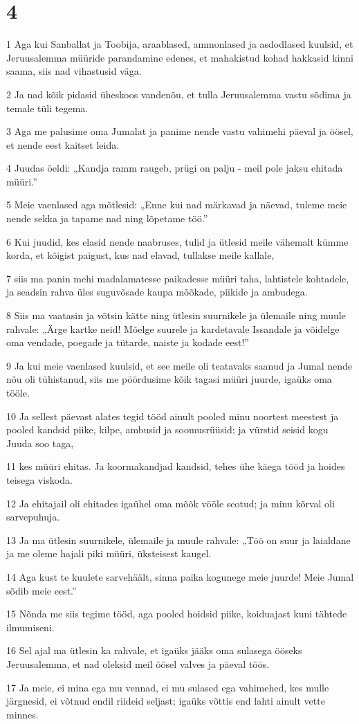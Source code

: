 \chapter{4}

\par 1 Aga kui Sanballat ja Toobija, araablased, ammonlased ja asdodlased kuulsid, et Jeruusalemma müüride parandamine edenes, et mahakistud kohad hakkasid kinni saama, siis nad vihastusid väga.
\par 2 Ja nad kõik pidasid üheskoos vandenõu, et tulla Jeruusalemma vastu sõdima ja temale tüli tegema.
\par 3 Aga me palusime oma Jumalat ja panime nende vastu vahimehi päeval ja öösel, et nende eest kaitset leida.
\par 4 Juudas öeldi: „Kandja ramm raugeb, prügi on palju - meil pole jaksu ehitada müüri.”
\par 5 Meie vaenlased aga mõtlesid: „Enne kui nad märkavad ja näevad, tuleme meie nende sekka ja tapame nad ning lõpetame töö.”
\par 6 Kui juudid, kes elasid nende naabruses, tulid ja ütlesid meile vähemalt kümme korda, et kõigist paigust, kus nad elavad, tullakse meile kallale,
\par 7 siis ma panin mehi madalamatesse paikadesse müüri taha, lahtistele kohtadele, ja seadsin rahva üles suguvõsade kaupa mõõkade, piikide ja ambudega.
\par 8 Siis ma vaatasin ja võtsin kätte ning ütlesin suurnikele ja ülemaile ning muule rahvale: „Ärge kartke neid! Mõelge suurele ja kardetavale Issandale ja võidelge oma vendade, poegade ja tütarde, naiste ja kodade eest!”
\par 9 Ja kui meie vaenlased kuulsid, et see meile oli teatavaks saanud ja Jumal nende nõu oli tühistanud, siis me pöördusime kõik tagasi müüri juurde, igaüks oma tööle.
\par 10 Ja sellest päevast alates tegid tööd ainult pooled minu noortest meestest ja pooled kandsid piike, kilpe, ambusid ja soomusrüüsid; ja vürstid seisid kogu Juuda soo taga,
\par 11 kes müüri ehitas. Ja koormakandjad kandsid, tehes ühe käega tööd ja hoides teisega viskoda.
\par 12 Ja ehitajail oli ehitades igaühel oma mõõk vööle seotud; ja minu kõrval oli sarvepuhuja.
\par 13 Ja ma ütlesin suurnikele, ülemaile ja muule rahvale: „Töö on suur ja laialdane ja me oleme hajali piki müüri, üksteisest kaugel.
\par 14 Aga kust te kuulete sarvehäält, sinna paika kogunege meie juurde! Meie Jumal sõdib meie eest.”
\par 15 Nõnda me siis tegime tööd, aga pooled hoidsid piike, koiduajast kuni tähtede ilmumiseni.
\par 16 Sel ajal ma ütlesin ka rahvale, et igaüks jääks oma sulasega ööseks Jeruusalemma, et nad oleksid meil öösel valves ja päeval töös.
\par 17 Ja meie, ei mina ega mu vennad, ei mu sulased ega vahimehed, kes mulle järgnesid, ei võtnud endil riideid seljast; igaüks võttis end lahti ainult vette minnes.

